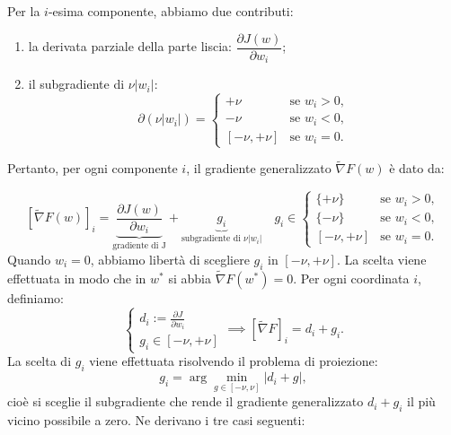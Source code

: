 \documentclass[a4paper,12pt]{article}
\begin{document}
Per la $i$-esima componente, abbiamo due contributi:

\begin{enumerate}
    \item la derivata parziale della parte liscia: $\dfrac{\partial J(w)}{\partial w_i}$;
    \item il subgradiente di $\nu |w_i|$:
    \[
    \partial (\nu |w_i|) =
    \begin{cases}
    +\nu & \text{se } w_i > 0, \\
    -\nu & \text{se } w_i < 0, \\
    [-\nu, +\nu] & \text{se } w_i = 0.
    \end{cases}
    \]
    \end{enumerate}

Pertanto, per ogni componente $i$, il gradiente generalizzato $\widetilde{\nabla} F(w)$
è dato da:

\[
[\widetilde{\nabla} F(w)]_i =
\underbrace{\frac{\partial J(w)}{\partial w_i}}_{\text{gradiente di J}}
+
\underbrace{g_i}_{\text{subgradiente di }\nu |w_i|} \quad
g_i \in
\begin{cases}
\{+\nu\} & \text{se } w_i > 0, \\
\{-\nu\} & \text{se } w_i < 0, \\
[-\nu, +\nu] & \text{se } w_i = 0.
\end{cases}
\]
Quando $w_i = 0$, abbiamo libertà di scegliere $g_i$ in $[-\nu, +\nu]$.
La scelta viene effettuata in modo che in $w^*$ si abbia $\widetilde{\nabla}F(w^*) = 0$.
Per ogni coordinata \(i\), definiamo:
\[
\begin{cases}d_i := \frac{\partial J}{\partial w_i} \\
g_i \in [-\nu, +\nu]\end{cases}\implies 
[\widetilde{\nabla}F]_i = d_i + g_i.
\]
La scelta di \(g_i\) viene effettuata risolvendo il problema di proiezione:
\[
g_i = \arg\min_{g \in [-\nu, \nu]} |d_i + g|,
\]
cioè si sceglie il subgradiente che rende il gradiente generalizzato \(d_i + g_i\) il più vicino possibile a zero. Ne derivano i tre casi seguenti:
\end{document}
